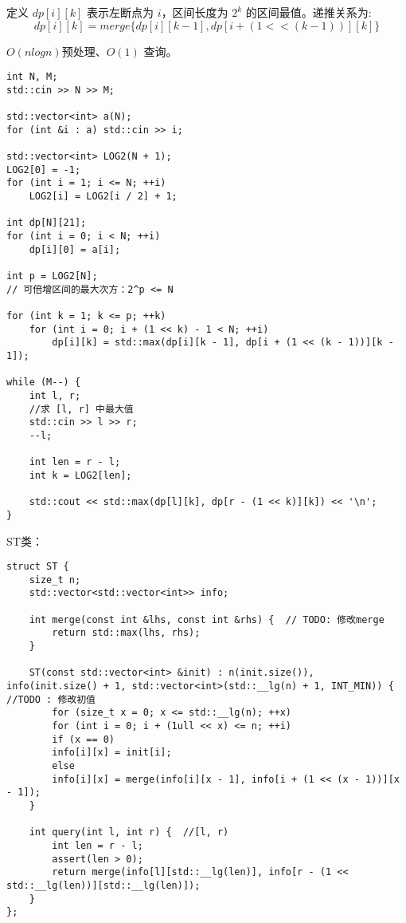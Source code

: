 定义 $dp[i][k]$ 表示左断点为 $i$，区间长度为 $2^k$ 的区间最值。递推关系为:
$$dp[i][k] = merge\{dp[i][k - 1], dp[i + (1 << (k - 1))][k]\}$$

$O(nlogn)$预处理、$O(1)$ 查询。
\begin{lstlisting}
int N, M;
std::cin >> N >> M;

std::vector<int> a(N);
for (int &i : a) std::cin >> i;

std::vector<int> LOG2(N + 1);
LOG2[0] = -1;
for (int i = 1; i <= N; ++i) 
	LOG2[i] = LOG2[i / 2] + 1;

int dp[N][21];
for (int i = 0; i < N; ++i) 
	dp[i][0] = a[i];

int p = LOG2[N];
// 可倍增区间的最大次方：2^p <= N

for (int k = 1; k <= p; ++k)
	for (int i = 0; i + (1 << k) - 1 < N; ++i)
		dp[i][k] = std::max(dp[i][k - 1], dp[i + (1 << (k - 1))][k - 1]);

while (M--) {
	int l, r;
	//求 [l, r] 中最大值
	std::cin >> l >> r;
	--l;
	
	int len = r - l;
	int k = LOG2[len];
	
	std::cout << std::max(dp[l][k], dp[r - (1 << k)][k]) << '\n';
}
\end{lstlisting}

ST类：
\begin{lstlisting}
struct ST {
	size_t n;
	std::vector<std::vector<int>> info;
	
	int merge(const int &lhs, const int &rhs) {  // TODO: 修改merge
		return std::max(lhs, rhs);
	}
	
	ST(const std::vector<int> &init) : n(init.size()), info(init.size() + 1, std::vector<int>(std::__lg(n) + 1, INT_MIN)) {  //TODO : 修改初值
		for (size_t x = 0; x <= std::__lg(n); ++x)
		for (int i = 0; i + (1ull << x) <= n; ++i)
		if (x == 0)
		info[i][x] = init[i];
		else
		info[i][x] = merge(info[i][x - 1], info[i + (1 << (x - 1))][x - 1]);
	}
	
	int query(int l, int r) {  //[l, r)
		int len = r - l;
		assert(len > 0);
		return merge(info[l][std::__lg(len)], info[r - (1 << std::__lg(len))][std::__lg(len)]);
	}
};
\end{lstlisting}